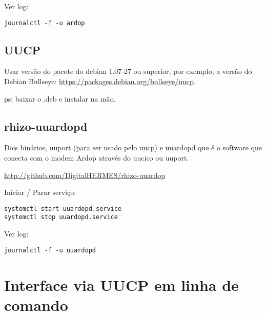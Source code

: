 \documentclass[11pt,a4paper]{article}
\begin{document}
Ver log:
\begin{verbatim}
journalctl -f -u ardop
\end{verbatim}

\subsection{UUCP}

Usar versão do pacote do debian 1.07-27 ou superior, por exemplo, a versão
do Debian Bullseye: \url{https://packages.debian.org/bullseye/uucp}.

ps: baixar o .deb e instalar na mão.

\subsection{rhizo-uuardopd}


Dois binários, uuport (para ser usado pelo uucp) e uuardopd que é o software
que conecta com o modem Ardop através do uucico ou uuport.

\url{http://github.com/DigitalHERMES/rhizo-uuardop}


Iniciar / Parar serviço:
\begin{verbatim}
systemctl start uuardopd.service
systemctl stop uuardopd.service
\end{verbatim}


Ver log:
\begin{verbatim}
journalctl -f -u uuardopd
\end{verbatim}




\section{Interface via UUCP em linha de comando}
\end{document}
